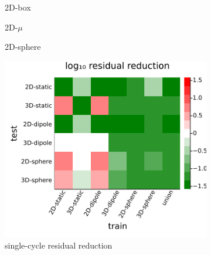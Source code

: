 \documentclass[review]{elsarticle}
\begin{document}
\begin{figure}
    \centering
    \begin{subfigure}[b]{0.3\textwidth}
        \centering
        \caption{2D-box}
        \label{fig:2D-box}
    \end{subfigure}
    \begin{subfigure}[b]{0.3\textwidth}
        \centering
        \caption{2D-$\mu$}
        \label{fig:2D-mu}
    \end{subfigure}
    \begin{subfigure}[b]{0.3\textwidth}
        \centering
        \caption{2D-sphere}
        \label{fig:2D-sphere}
    \end{subfigure}
    \begin{subfigure}[b]{0.47\textwidth}
        \centering
        \includegraphics[width=\textwidth]{figures/crossloss.png}
        \caption{single-cycle residual reduction}
        \label{fig:cross plot}
    \end{subfigure}
    \hfill
    \begin{subfigure}[b]{0.47\textwidth}
        \centering

\end{subfigure}
\end{figure}
\end{document}
